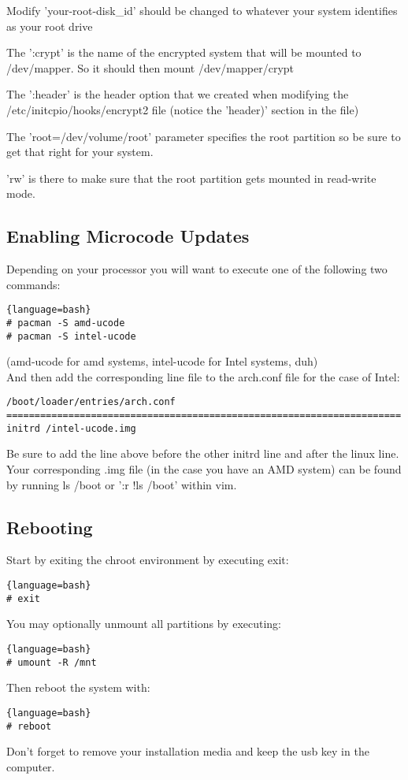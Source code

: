 Modify 'your-root-disk\_id' should be changed to whatever your system identifies as your root drive

The ':crypt' is the name of the encrypted system that will be mounted to /dev/mapper. So it should then mount /dev/mapper/crypt

The ':header' is the header option that we created when modifying the /etc/initcpio/hooks/encrypt2 file (notice the 'header)' section in the file)

The 'root=/dev/volume/root' parameter specifies the root partition so be sure to get that right for your system.

'rw' is there to make sure that the root partition gets mounted in read-write mode.

\subsection{Enabling Microcode Updates}
Depending on your processor you will want to execute one of the following two commands:
\begin{lstlisting}{language=bash}
# pacman -S amd-ucode
# pacman -S intel-ucode
\end{lstlisting}
(amd-ucode for amd systems, intel-ucode for Intel systems, duh)\\
And then add the corresponding line file to the arch.conf file for the case of Intel:
\begin{verbatim}
/boot/loader/entries/arch.conf
======================================================================
initrd /intel-ucode.img
\end{verbatim}
Be sure to add the line above before the other initrd line and after the linux line.
Your corresponding .img file (in the case you have an AMD system) can be found by running ls /boot or ':r !ls /boot' within vim.

\subsection{Rebooting}
Start by exiting the chroot environment by executing exit:
\begin{lstlisting}{language=bash}
# exit
\end{lstlisting}
You may optionally unmount all partitions by executing:
\begin{lstlisting}{language=bash}
# umount -R /mnt
\end{lstlisting}
Then reboot the system with:
\begin{lstlisting}{language=bash}
# reboot
\end{lstlisting}
Don't forget to remove your installation media and keep the usb key in the computer.

